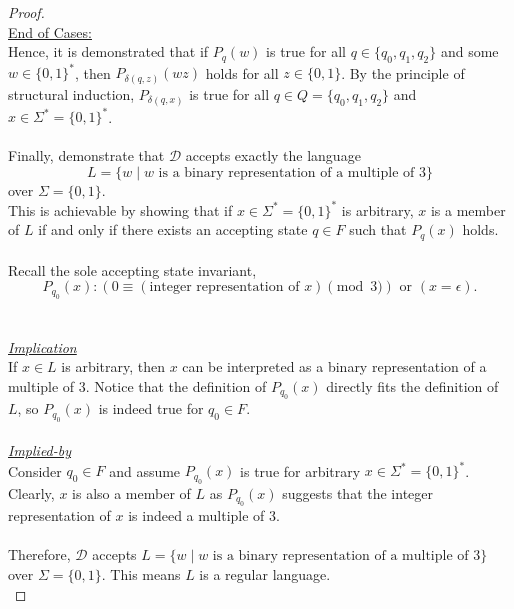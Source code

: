 \documentclass[12pt]{article}
\begin{document}
\begin{proof}
    \\
    \underline{End of Cases:} \\
    Hence, it is demonstrated that if $P_q(w)$ is true for all $q \in \{q_0, q_1, q_2\}$ and some $w \in \{0, 1\}^*$, then $P_{\delta(q, z)}(wz)$ holds for all $z \in \{0, 1\}$. By the principle of structural induction, $P_{\delta(q, x)}$ is true for all $q \in Q = \{q_0, q_1, q_2\}$ and $x \in \Sigma^* = \{0, 1\}^*$. \\
    \\
    Finally, demonstrate that $\mathcal{D}$ accepts exactly the language \[L = \{ w \mid w \text{ is a binary representation of a multiple of 3} \}\] over $\Sigma = \{0, 1\}$. \\
    This is achievable by showing that if $x \in \Sigma^* = \{0, 1\}^*$ is arbitrary, $x$ is a member of $L$ if and only if there exists an accepting state $q \in F$ such that $P_q(x)$ holds. \\
    \\
    Recall the sole accepting state invariant, \[P_{q_0}(x): (0 \equiv (\text{integer representation of } x) \pmod{3}) \text{ or } (x = \epsilon) \text{.}\] \\
    \\
    \underline{\textit{Implication}} \\
    If $x \in L$ is arbitrary, then $x$ can be interpreted as a binary representation of a multiple of $3$. Notice that the definition of $P_{q_0}(x)$ directly fits the definition of $L$, so $P_{q_0}(x)$ is indeed true for $q_0 \in F$. \\
    \\
    \underline{\textit{Implied-by}} \\
    Consider $q_0 \in F$ and assume $P_{q_0}(x)$ is true for arbitrary $x \in \Sigma^* = \{0, 1\}^*$. Clearly, $x$ is also a member of $L$ as $P_{q_0}(x)$ suggests that the integer representation of $x$ is indeed a multiple of 3. \\
    \\
    Therefore, $\mathcal{D}$ accepts \(L = \{ w \mid w \text{ is a binary representation of a multiple of 3} \}\) over $\Sigma = \{0, 1\}$. This means $L$ is a regular language. \\
\end{proof}
\leavevmode\\
\pagebreak
\end{document}
